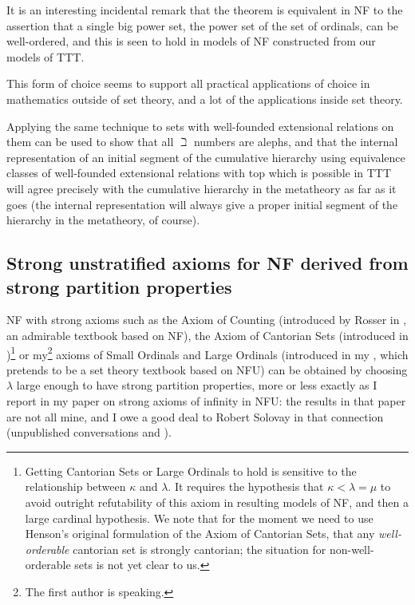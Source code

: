 \documentclass{article}
\theoremstyle{definition}
\theoremstyle{remark}
\begin{document}
It is an interesting incidental remark that the theorem is equivalent in NF to the assertion that a single big power set, the power set of the set of ordinals, can be well-ordered, and this is seen to hold in models of NF constructed from our models of TTT.

This form of choice seems to support all practical applications of choice in mathematics outside of set theory, and a lot of the applications inside set theory.

Applying the same technique to sets with well-founded extensional relations on them can be used to show that all $\beth$ numbers are alephs, and that the internal representation of an initial segment of the cumulative hierarchy using equivalence classes of well-founded extensional relations with top which is possible in TTT will agree precisely with the cumulative hierarchy in the metatheory as far as it goes (the internal representation will always give a proper initial segment of the hierarchy in the metatheory, of course).

\subsection{Strong unstratified axioms for NF derived from strong partition properties}

NF with strong axioms such as the Axiom of Counting (introduced by Rosser in \cite{rosser}, an admirable textbook based on NF), the Axiom of Cantorian Sets (introduced in \cite{henson})\footnote{Getting Cantorian Sets or Large Ordinals to hold is sensitive to the relationship between $\kappa$ and $\lambda$.  It requires the hypothesis that $\kappa<\lambda=\mu$ to avoid outright refutability of this axiom in resulting models of NF, and then a large cardinal hypothesis.  We note that for the moment we need to use Henson's original formulation of the Axiom of Cantorian Sets, that any {\em well-orderable\/} cantorian set is strongly cantorian;  the situation for non-well-orderable sets is not yet clear to us.} or my\footnote{The first author is speaking.} axioms of Small Ordinals and Large Ordinals (introduced in  my \cite{mybook}, which pretends to be a set theory textbook based on NFU) can be obtained by choosing $\lambda$ large enough to have strong partition properties, more or less exactly as I report in my paper \cite{strongaxioms} on strong axioms of infinity in NFU:  the results in that paper are not all mine, and I owe a good deal to Robert Solovay in that connection (unpublished conversations and \cite{nfub}).
\end{document}
